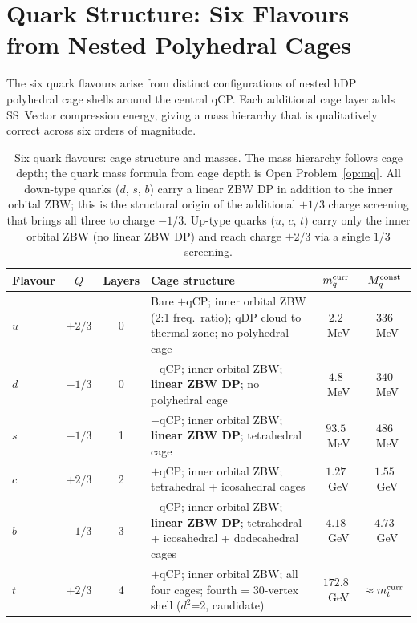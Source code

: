 \documentclass[11pt,a4paper]{article}
\begin{document}
\section{Quark Structure: Six Flavours from Nested Polyhedral Cages}
\label{sec:quarks}

The six quark flavours arise from distinct configurations of nested
hDP polyhedral cage shells around the central qCP.  Each additional
cage layer adds SS~Vector compression energy, giving a mass hierarchy
that is qualitatively correct across six orders of magnitude.

\begin{table}[H]
\centering
\caption{Six quark flavours: cage structure and masses.  The mass
  hierarchy follows cage depth; the quark mass formula from cage
  depth is Open Problem~\ref{op:mq}.
  All down-type quarks ($d$, $s$, $b$) carry a linear ZBW DP
  in addition to the inner orbital ZBW; this is the structural
  origin of the additional $+1/3$ charge screening that brings
  all three to charge $-1/3$.  Up-type quarks ($u$, $c$, $t$)
  carry only the inner orbital ZBW (no linear ZBW DP) and
  reach charge $+2/3$ via a single $1/3$ screening.}
\label{tab:quarks}
\begin{tabular}{@{}lccp{5.2cm}cc@{}}
\toprule
Flavour & $Q$ & Layers & Cage structure & $m_q^{\rm curr}$ & $M_q^{\rm const}$ \\
\midrule
$u$ & $+2/3$ & 0 & Bare $+$qCP; inner orbital ZBW (2:1 freq.\ ratio);
    qDP cloud to thermal zone; no polyhedral cage
  & $2.2$~MeV & $336$~MeV \\
$d$ & $-1/3$ & 0 & $-$qCP; inner orbital ZBW; \textbf{linear ZBW DP};
    no polyhedral cage
  & $4.8$~MeV & $340$~MeV \\
$s$ & $-1/3$ & 1 & $-$qCP; inner orbital ZBW; \textbf{linear ZBW DP};
    tetrahedral cage
  & $93.5$~MeV & $486$~MeV \\
$c$ & $+2/3$ & 2 & $+$qCP; inner orbital ZBW;
    tetrahedral + icosahedral cages
  & $1.27$~GeV & $1.55$~GeV \\
$b$ & $-1/3$ & 3 & $-$qCP; inner orbital ZBW; \textbf{linear ZBW DP};
    tetrahedral + icosahedral + dodecahedral cages
  & $4.18$~GeV & $4.73$~GeV \\
$t$ & $+2/3$ & 4 & $+$qCP; inner orbital ZBW;
    all four cages; fourth = 30-vertex shell ($d^2$=2, candidate)
  & $172.8$~GeV & $\approx m_t^{\rm curr}$ \\
\bottomrule
\end{tabular}
\end{table}
\end{document}
